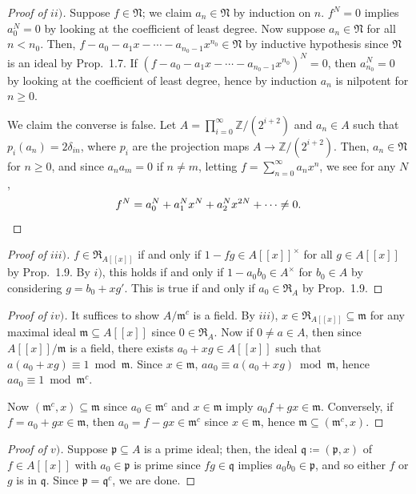 \documentclass[12pt,letterpaper]{article}
\theoremstyle{definition}
\theoremstyle{remark}
\numberwithin{figure}{problem}
\numberwithin{equation}{section}
\begin{document}
\begin{proof}[Proof of $ii)$]
  Suppose $f \in \mathfrak{N}$; we claim $a_n \in \mathfrak{N}$ by induction on $n$. $f^N = 0$ implies $a_0^N = 0$ by looking at the coefficient of least degree. Now suppose $a_n \in \mathfrak{N}$ for all $n < n_0$. Then, $f - a_0 - a_1x - \cdots - a_{n_0-1}x^{n_0} \in \mathfrak{N}$ by inductive hypothesis since $\mathfrak{N}$ is an ideal by Prop.~1.7. If $(f - a_0 - a_1x - \cdots - a_{n_0-1}x^{n_0})^N = 0$, then $a_{n_0}^N = 0$ by looking at the coefficient of least degree, hence by induction $a_n$ is nilpotent for $n \ge 0$.
  \par We claim the converse is false. Let $A = \prod_{i=0}^\infty \mathbb{Z}/(2^{i+2})$ and $a_n \in A$ such that $p_i(a_n) = 2\delta_{in}$, where $p_i$ are the projection maps $A \to \mathbb{Z}/(2^{i+2})$. Then, $a_n \in \mathfrak{N}$ for $n \ge 0$, and since $a_na_m = 0$ if $n \ne m$, letting $f = \sum_{n=0}^\infty a_nx^n$, we see for any $N$,
  \begin{equation*}
    f^N = a_0^N + a_1^Nx^N + a_2^Nx^{2N} + \cdots \ne 0.\qedhere
  \end{equation*}
\end{proof}
\begin{proof}[Proof of $iii)$]
  $f \in \mathfrak{R}_{A[[x]]}$ if and only if $1 - fg \in A[[x]]^\times$ for all $g \in A[[x]]$ by Prop.~1.9. By $i)$, this holds if and only if $1-a_0b_0 \in A^\times$ for $b_0 \in A$ by considering $g = b_0 + xg'$. This is true if and only if $a_0 \in \mathfrak{R}_A$ by Prop.~1.9.
\end{proof}
\begin{proof}[Proof of $iv)$]
  It suffices to show $A/\mathfrak{m}^c$ is a field. By $iii)$, $x \in \mathfrak{R}_{A[[x]]} \subseteq \mathfrak{m}$ for any maximal ideal $\mathfrak{m} \subseteq A[[x]]$ since $0 \in \mathfrak{R}_A$. Now if $0 \ne a \in A$, then since $A[[x]]/\mathfrak{m}$ is a field, there exists $a_0 + xg \in A[[x]]$ such that $a(a_0 + xg) \equiv 1 \bmod \mathfrak{m}$. Since $x \in \mathfrak{m}$, $aa_0 \equiv a(a_0 + xg) \bmod \mathfrak{m}$, hence $aa_0 \equiv 1 \bmod \mathfrak{m}^c$.
  \par Now $(\mathfrak{m}^c,x) \subseteq \mathfrak{m}$ since $a_0 \in \mathfrak{m}^c$ and $x \in \mathfrak{m}$ imply $a_0f + gx \in \mathfrak{m}$. Conversely, if $f = a_0 + gx \in \mathfrak{m}$, then $a_0 = f - gx \in \mathfrak{m}^c$ since $x \in \mathfrak{m}$, hence $\mathfrak{m} \subseteq (\mathfrak{m}^c,x)$.
\end{proof}
\begin{proof}[Proof of $v)$]
  Suppose $\mathfrak{p} \subseteq A$ is a prime ideal; then, the ideal $\mathfrak{q} \coloneqq (\mathfrak{p},x)$ of $f \in A[[x]]$ with $a_0 \in \mathfrak{p}$ is prime since $fg \in \mathfrak{q}$ implies $a_0b_0 \in \mathfrak{p}$, and so either $f$ or $g$ is in $\mathfrak{q}$. Since $\mathfrak{p} = \mathfrak{q}^c$, we are done.
\end{proof}
\end{document}
